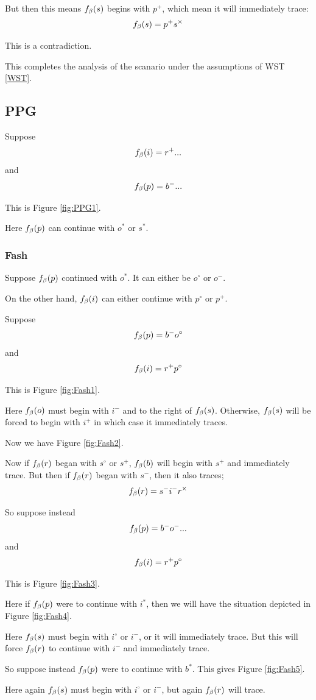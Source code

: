 But then this means $f_\beta(s)$ begins with $p^+$, which mean it will immediately trace:
$$f_\beta(s) = p^+ s^\times$$

This is a contradiction.

This completes the analysis of the scanario under the assumptions of WST \ref{WST}.

\subsection{PPG}\label{PPG}
Suppose
$$f_\beta(i) = r^+...$$
and
$$f_\beta(p) = b^-...$$

This is Figure \ref{fig:PPG1}.

Here $f_\beta(p)$ can continue with $o^*$ or $s^*$.

\subsubsection{Fash}\label{Fash}
Suppose $f_\beta(p)$ continued with $o^*$. It can either be $o^\circ$ or $o^-$.

On the other hand, $f_\beta(i)$ can either continue with $p^\circ$ or $p^+$.

Suppose
$$f_\beta(p) = b^- o^\circ$$
and
$$f_\beta(i) = r^+ p^\circ$$

This is Figure \ref{fig:Fash1}.

Here $f_\beta(o)$ must begin with $i^-$ and to the right of $f_\beta(s)$. Otherwise, $f_\beta(s)$ will be forced to begin with $i^+$ in which case it immediately traces. 

Now we have Figure \ref{fig:Fash2}.

Now if $f_\beta(r)$ began with $s^\circ$ or $s^+$, $f_\beta(b)$ will begin with $s^+$ and immediately trace. But then if $f_\beta(r)$ began with $s^-$, then it also traces;
$$f_\beta(r) = s^- i^- r^\times$$

So suppose instead 
$$f_\beta(p) = b^- o^-...$$
and
$$f_\beta(i) = r^+ p^\circ$$

This is Figure \ref{fig:Fash3}.

Here if $f_\beta(p)$ were to continue with $i^*$, then we will have the situation depicted in Figure \ref{fig:Fash4}.

Here $f_\beta(s)$ must begin with $i^\circ$ or $i^-$, or it will immediately trace. But this will force $f_\beta(r)$ to continue with $i^-$ and immediately trace.

So suppose instead $f_\beta(p)$ were to continue with $b^*$. This gives Figure \ref{fig:Fash5}.

Here again $f_\beta(s)$ must begin with $i^\circ$ or $i^-$, but again $f_\beta(r)$ will trace.


